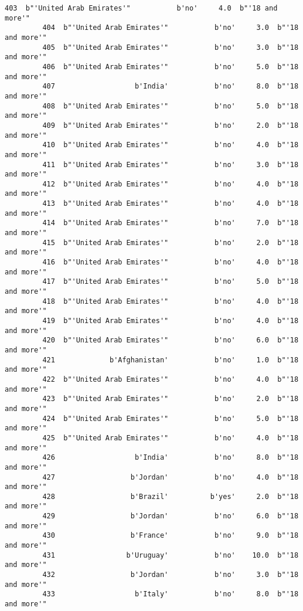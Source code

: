 \documentclass[11pt]{article}
\begin{document}
\begin{Verbatim}[commandchars=\\\{\}]
         403  b"'United Arab Emirates'"           b'no'     4.0  b"'18 and more'"   
         404  b"'United Arab Emirates'"           b'no'     3.0  b"'18 and more'"   
         405  b"'United Arab Emirates'"           b'no'     3.0  b"'18 and more'"   
         406  b"'United Arab Emirates'"           b'no'     5.0  b"'18 and more'"   
         407                   b'India'           b'no'     8.0  b"'18 and more'"   
         408  b"'United Arab Emirates'"           b'no'     5.0  b"'18 and more'"   
         409  b"'United Arab Emirates'"           b'no'     2.0  b"'18 and more'"   
         410  b"'United Arab Emirates'"           b'no'     4.0  b"'18 and more'"   
         411  b"'United Arab Emirates'"           b'no'     3.0  b"'18 and more'"   
         412  b"'United Arab Emirates'"           b'no'     4.0  b"'18 and more'"   
         413  b"'United Arab Emirates'"           b'no'     4.0  b"'18 and more'"   
         414  b"'United Arab Emirates'"           b'no'     7.0  b"'18 and more'"   
         415  b"'United Arab Emirates'"           b'no'     2.0  b"'18 and more'"   
         416  b"'United Arab Emirates'"           b'no'     4.0  b"'18 and more'"   
         417  b"'United Arab Emirates'"           b'no'     5.0  b"'18 and more'"   
         418  b"'United Arab Emirates'"           b'no'     4.0  b"'18 and more'"   
         419  b"'United Arab Emirates'"           b'no'     4.0  b"'18 and more'"   
         420  b"'United Arab Emirates'"           b'no'     6.0  b"'18 and more'"   
         421             b'Afghanistan'           b'no'     1.0  b"'18 and more'"   
         422  b"'United Arab Emirates'"           b'no'     4.0  b"'18 and more'"   
         423  b"'United Arab Emirates'"           b'no'     2.0  b"'18 and more'"   
         424  b"'United Arab Emirates'"           b'no'     5.0  b"'18 and more'"   
         425  b"'United Arab Emirates'"           b'no'     4.0  b"'18 and more'"   
         426                   b'India'           b'no'     8.0  b"'18 and more'"   
         427                  b'Jordan'           b'no'     4.0  b"'18 and more'"   
         428                  b'Brazil'          b'yes'     2.0  b"'18 and more'"   
         429                  b'Jordan'           b'no'     6.0  b"'18 and more'"   
         430                  b'France'           b'no'     9.0  b"'18 and more'"   
         431                 b'Uruguay'           b'no'    10.0  b"'18 and more'"   
         432                  b'Jordan'           b'no'     3.0  b"'18 and more'"   
         433                   b'Italy'           b'no'     8.0  b"'18 and more'"   

\end{Verbatim}
\end{document}
